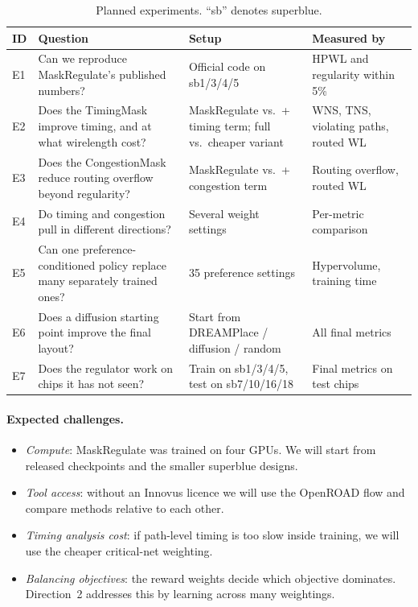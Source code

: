 \documentclass{article}
\begin{document}
\begin{table}[H]
\centering
\caption{Planned experiments. ``sb'' denotes superblue.}
\label{tab:exps}
\small
\begin{tabular}{@{}L{0.6cm}L{5.6cm}L{4.4cm}L{3.6cm}@{}}
\toprule
\textbf{ID} & \textbf{Question} & \textbf{Setup} & \textbf{Measured by} \\
\midrule
E1 & Can we reproduce MaskRegulate's published numbers? & Official code on sb1/3/4/5 & HPWL and regularity within 5\% \\
E2 & Does the TimingMask improve timing, and at what wirelength cost? & MaskRegulate vs.\ + timing term; full vs.\ cheaper variant & WNS, TNS, violating paths, routed WL \\
E3 & Does the CongestionMask reduce routing overflow beyond regularity? & MaskRegulate vs.\ + congestion term & Routing overflow, routed WL \\
E4 & Do timing and congestion pull in different directions? & Several weight settings & Per-metric comparison \\
E5 & Can one preference-conditioned policy replace many separately trained ones? & 35 preference settings & Hypervolume, training time \\
E6 & Does a diffusion starting point improve the final layout? & Start from DREAMPlace / diffusion / random & All final metrics \\
E7 & Does the regulator work on chips it has not seen? & Train on sb1/3/4/5, test on sb7/10/16/18 & Final metrics on test chips \\
\bottomrule
\end{tabular}
\end{table}

\paragraph{Expected challenges.}
\begin{itemize}
  \item \emph{Compute}: MaskRegulate was trained on four GPUs. We will start from released checkpoints
  and the smaller superblue designs.
  \item \emph{Tool access}: without an Innovus licence we will use the OpenROAD flow and compare
  methods relative to each other.
  \item \emph{Timing analysis cost}: if path-level timing is too slow inside training, we will use the
  cheaper critical-net weighting.
  \item \emph{Balancing objectives}: the reward weights decide which objective dominates. Direction~2
  addresses this by learning across many weightings.
\end{itemize}
\end{document}
